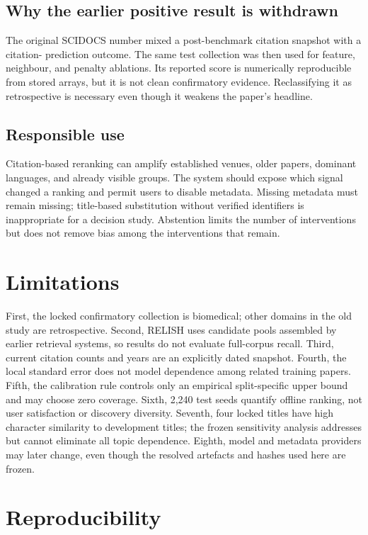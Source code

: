 \documentclass[11pt]{article}
\begin{document}
\subsection{Why the earlier positive result is withdrawn}

The original SCIDOCS number mixed a post-benchmark citation snapshot with a citation-
prediction outcome.  The same test collection was then used for feature, neighbour,
and penalty ablations.  Its reported score is numerically reproducible from stored
arrays, but it is not clean confirmatory evidence.  Reclassifying it as retrospective
is necessary even though it weakens the paper's headline.

\subsection{Responsible use}

Citation-based reranking can amplify established venues, older papers, dominant
languages, and already visible groups.  The system should expose which signal changed
a ranking and permit users to disable metadata.  Missing metadata must remain missing;
title-based substitution without verified identifiers is inappropriate for a decision
study.  Abstention limits the number of interventions but does not remove bias among
the interventions that remain.

\section{Limitations}

First, the locked confirmatory collection is biomedical; other domains in the old
study are retrospective.  Second, RELISH uses candidate pools assembled by earlier
retrieval systems, so results do not evaluate full-corpus recall.  Third, current
citation counts and years are an explicitly dated snapshot.  Fourth, the local
standard error does not model dependence among related training papers.  Fifth, the
calibration rule controls only an empirical split-specific upper bound and may choose
zero coverage.  Sixth, 2,240 test seeds quantify offline ranking, not user satisfaction
or discovery diversity.  Seventh, four locked titles have high character similarity
to development titles; the frozen sensitivity analysis addresses but cannot eliminate
all topic dependence.  Eighth, model and metadata providers may later change, even
though the resolved artefacts and hashes used here are frozen.

\section{Reproducibility}
\end{document}
